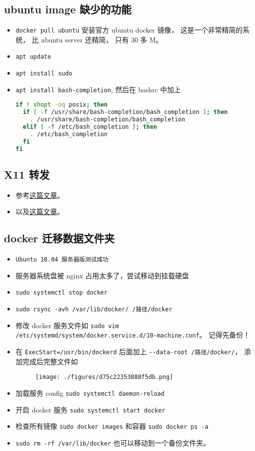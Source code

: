 \subsection{ubuntu image 缺少的功能}
\begin{itemize}
\item \verb`docker pull ubuntu` 安装官方 ubuntu docker 镜像， 这是一个非常精简的系统， 比 ubuntu server 还精简， 只有 30 多 M。
\item \verb`apt update`
\item \verb`apt install sudo`
\item \verb`apt install bash-completion`, 然后在 bashrc 中加上
\begin{lstlisting}[language=bash]
if ! shopt -oq posix; then
  if [ -f /usr/share/bash-completion/bash_completion ]; then
    . /usr/share/bash-completion/bash_completion
  elif [ -f /etc/bash_completion ]; then
    . /etc/bash_completion
  fi
fi
\end{lstlisting}
\end{itemize}

\subsection{X11 转发}
\begin{itemize}
\item 参考\href{https://opendata-forum.cern.ch/t/x11-forwarding-with-docker/31}{这篇文章}。
\item 以及\href{https://www.howtogeek.com/devops/how-to-run-gui-applications-in-a-docker-container/}{这篇文章}。
\end{itemize}

\subsection{docker 迁移数据文件夹}
\begin{itemize}
\item \verb`Ubuntu 18.04 服务器版测试成功`
\item 服务器系统盘被 nginx 占用太多了，尝试移动到挂载硬盘
\item \verb`sudo systemctl stop docker`
\item \verb`sudo rsync -avh /var/lib/docker/ /路径/docker`
\item 修改 docker 服务文件如 \verb`sudo vim /etc/systemd/system/docker.service.d/10-machine.conf`。 记得先备份！
\item 在 \verb`ExecStart=/usr/bin/dockerd` 后面加上 \verb`--data-root /路径/docker/`， 添加完成后完整文件如
\begin{figure}[ht]
\centering
\texttt{[image: ./figures/d75c22353888f5db.png]}
\caption{} \label{fig_Docker_1}
\end{figure}
\item 加载服务 config \verb`sudo systemctl daemon-reload`
\item 开启 docker 服务 \verb`sudo systemctl start docker`
\item 检查所有镜像 \verb`sudo docker images` 和容器 \verb`sudo docker ps -a`
\item \verb`sudo rm -rf /var/lib/docker` 也可以移动到一个备份文件夹。
\end{itemize}
